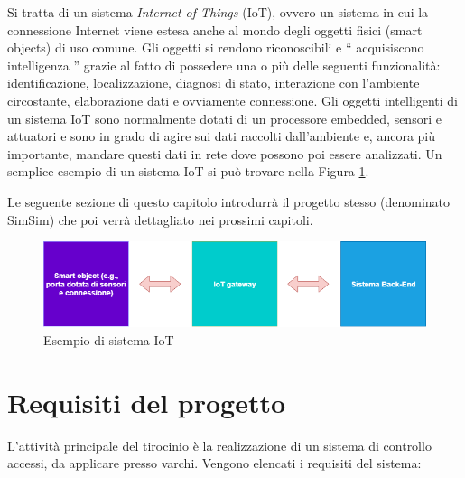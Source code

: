 \documentclass[12pt]{report}
\begin{document}
Si tratta di un sistema \emph{Internet of Things} (IoT), ovvero un sistema in cui la connessione Internet viene estesa anche al mondo degli oggetti fisici (smart objects\cite{smart_objects}) di uso comune. Gli oggetti si rendono riconoscibili e \textquotedblleft{} acquisiscono intelligenza \textquotedblright{} grazie al fatto di possedere una o più delle seguenti funzionalità: identificazione, localizzazione, diagnosi di stato, interazione con l'ambiente circostante, elaborazione dati e ovviamente connessione.
Gli oggetti intelligenti di un sistema IoT sono normalmente dotati di un processore embedded, sensori e attuatori e sono in grado di agire sui dati raccolti dall'ambiente e, ancora più importante, mandare questi dati in rete dove possono poi essere analizzati\cite{IoT}. Un semplice esempio di un sistema IoT si può trovare nella Figura \ref{fig:iot_diagram}.

Le seguente sezione di questo capitolo introdurrà il progetto stesso (denominato SimSim) che poi verrà dettagliato nei prossimi capitoli.

\begin{figure}
	\includegraphics[width=\linewidth]{./img/iot_diagram.png}
	\caption{Esempio di sistema IoT}
	\label{fig:iot_diagram}
\end{figure}


%
\section{Requisiti del progetto}\label{sec:req}
%

L'attività principale del tirocinio è la realizzazione di un sistema di controllo accessi, da applicare presso varchi. Vengono elencati i requisiti del sistema:
\end{document}
